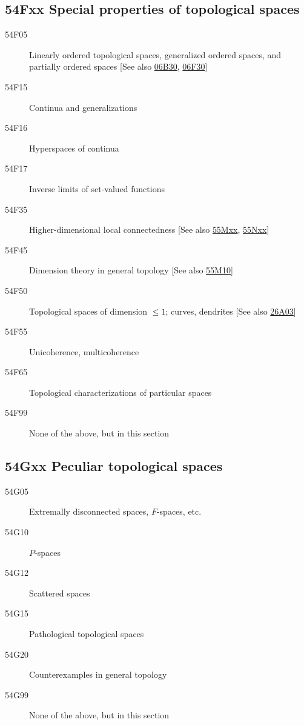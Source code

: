 \documentclass[letterpaper]{article}
\begin{document}
\subsection*{54Fxx  Special properties of topological spaces}\label{54Fxx}
\begin{description}  
\item [54F05]\label{54F05} Linearly ordered topological spaces, generalized ordered spaces, and partially ordered spaces [See also \hyperref[06B30]{06B30}, \hyperref[06F30]{06F30}]
\item [54F15]\label{54F15} Continua and generalizations
\item [54F16]\label{54F16} Hyperspaces of continua
\item [54F17]\label{54F17} Inverse limits of set-valued functions
\item [54F35]\label{54F35} Higher-dimensional local connectedness [See also \hyperref[55Mxx]{55Mxx}, \hyperref[55Nxx]{55Nxx}]
\item [54F45]\label{54F45} Dimension theory in general topology [See also \hyperref[55M10]{55M10}]
\item [54F50]\label{54F50} Topological spaces of dimension $\leq 1$; curves, dendrites [See also \hyperref[26A03]{26A03}]
\item [54F55]\label{54F55} Unicoherence, multicoherence
\item [54F65]\label{54F65} Topological characterizations of particular spaces
\item [54F99]\label{54F99} None of the above, but in this section
\end{description}
\subsection*{54Gxx  Peculiar topological spaces }\label{54Gxx}
\begin{description}  
\item [54G05]\label{54G05} Extremally disconnected spaces, $F$-spaces, etc.
\item [54G10]\label{54G10} $P$-spaces
\item [54G12]\label{54G12} Scattered spaces
\item [54G15]\label{54G15} Pathological topological spaces
\item [54G20]\label{54G20} Counterexamples in general topology
\item [54G99]\label{54G99} None of the above, but in this section
\end{description}
\end{document}
